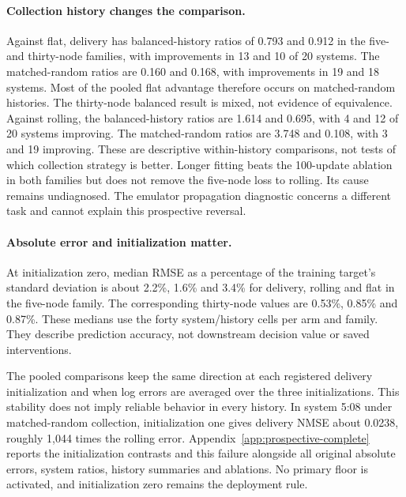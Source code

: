 \paragraph{Collection history changes the comparison.}
Against flat, delivery has balanced-history ratios of 0.793 and 0.912 in the
five- and thirty-node families, with improvements in 13 and 10 of 20 systems.
The matched-random ratios are 0.160 and 0.168, with improvements in 19 and 18
systems. Most of the pooled flat advantage therefore occurs on matched-random
histories. The thirty-node balanced result is mixed, not evidence of equivalence.
Against rolling, the balanced-history ratios are 1.614 and 0.695, with 4 and
12 of 20 systems improving. The matched-random ratios are 3.748 and 0.108, with
3 and 19 improving. These are descriptive within-history comparisons, not tests
of which collection strategy is better. Longer fitting beats the 100-update ablation in both
families but does not remove the five-node loss to rolling. Its cause remains
undiagnosed. The emulator propagation diagnostic concerns a different task and
cannot explain this prospective reversal.

\paragraph{Absolute error and initialization matter.}
At initialization zero, median RMSE as a percentage of the training target's
standard deviation is about 2.2\%, 1.6\% and 3.4\% for delivery, rolling and flat
in the five-node family. The corresponding thirty-node values are 0.53\%,
0.85\% and 0.87\%. These medians use the forty system/history cells per arm
and family. They describe prediction accuracy, not downstream decision value
or saved interventions.

The pooled comparisons keep the same direction at each registered delivery
initialization and when log errors are averaged over the three initializations.
This stability does not imply reliable behavior in every history. In system
5:08 under matched-random collection, initialization one gives delivery NMSE
about 0.0238, roughly 1,044 times the rolling error. Appendix~\ref{app:prospective-complete}
reports the initialization contrasts and this failure alongside all original
absolute errors, system ratios, history summaries and ablations. No primary
floor is activated, and initialization zero remains the deployment rule.

